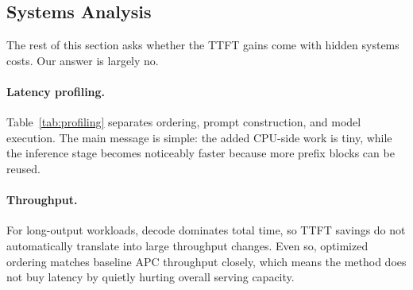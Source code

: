 \documentclass{article}
\begin{document}
\subsection{Systems Analysis}
\label{sec:systems}

The rest of this section asks whether the TTFT gains come with hidden systems costs. Our answer is largely no.

\paragraph{Latency profiling.}
Table~\ref{tab:profiling} separates ordering, prompt construction, and model execution. The main message is simple: the added CPU-side work is tiny, while the inference stage becomes noticeably faster because more prefix blocks can be reused.

\begin{table}[t]
\caption{Per-request latency breakdown (RTX 4090, 195 post-warmup queries). APC+Opt.\ Order+Build totals 66\,$\mu$s (incremental ${\sim}$26\,$\mu$s over APC+Retr.) while reducing inference p50 by 29\%.}
\label{tab:profiling}
\centering
\small
{}
\vspace{-0.5em}
\end{table}

\paragraph{Throughput.}
For long-output workloads, decode dominates total time, so TTFT savings do not automatically translate into large throughput changes. Even so, optimized ordering matches baseline APC throughput closely, which means the method does not buy latency by quietly hurting overall serving capacity.
\end{document}

